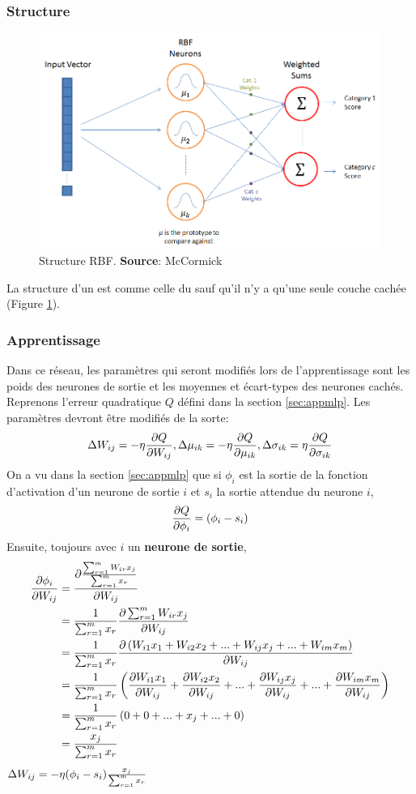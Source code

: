 \subsubsection{Structure}
\begin{figure}
 \centering
 \includegraphics[scale=0.5]{../figures/RBFstruct.png}
 \caption{Structure RBF. \textbf{Source}: McCormick\cite{RBFtuto}}
 \label{structurerbf}
\end{figure}
La structure d'un \rbf est comme celle du \mlp sauf qu'il n'y a qu'une seule couche cachée (Figure \ref{structurerbf}).
\subsubsection{Apprentissage}
Dans ce réseau, les paramètres qui seront modifiés lors de l'apprentissage sont les poids des neurones de sortie et les moyennes et écart-types des neurones cachés.
Reprenons l'erreur quadratique $Q$ défini dans la section \ref{sec:appmlp}.
Les paramètres devront être modifiés de la sorte:
\[\Delta W_{ij} = -\eta \frac{\partial Q}{\partial W_{ij}}, \Delta \mu_{ik} = -\eta \frac{\partial Q}{\partial \mu_{ik}}, \Delta \sigma_{ik} = \eta \frac{\partial Q}{\partial \sigma_{ik}}\]
On a vu dans la section \ref{sec:appmlp} que si $\phi_i$ est la sortie de la fonction d'activation d'un neurone de sortie $i$ et $s_i$ la sortie attendue du neurone $i$,
\[\frac{\partial Q}{\partial \phi_i} = (\phi_i - s_i)\]
Ensuite, toujours avec $i$ un \textbf{neurone de sortie},
\begin{equation}
 \begin{split}
  \frac{\partial \phi_i}{\partial W_{ij}} & = \frac{\partial \frac{\sum_{r=1}^{m}W_{ir}x_{j}}{\sum_{r=1}^{m}x_{r}}}{\partial W_{ij}}\\
  ~ & = \frac{1}{\sum_{r=1}^{m}x_{r}} \frac{\partial \sum_{r=1}^{m}W_{ir}x_{j}}{\partial W_{ij}}\\
  ~ & = \frac{1}{\sum_{r=1}^{m}x_{r}} \frac{\partial \left(W_{i1}x_1 + W_{i2}x_2 + ... + W_{ij}x_j + ... + W_{im}x_m\right)}{\partial W_{ij}}\\
  ~ & = \frac{1}{\sum_{r=1}^{m}x_{r}} \left(\frac{\partial W_{i1}x_1}{\partial W_{ij}} + \frac{\partial W_{i2}x_2}{\partial W_{ij}} + ... + \frac{\partial W_{ij}x_j}{\partial W_{ij}} + ... + \frac{\partial W_{im}x_m}{\partial W_{ij}}\right)\\
  ~ & = \frac{1}{\sum_{r=1}^{m}x_{r}} \left(0 + 0 + ... + x_j + ... + 0\right)\\
  ~ & = \frac{x_j}{\sum_{r=1}^{m}x_{r}}
 \end{split}
\end{equation}\label{eq:b}
$\Delta W_{ij} = -\eta (\phi_i - s_i) \frac{x_j}{\sum_{r=1}^{m}x_{r}}$\\

